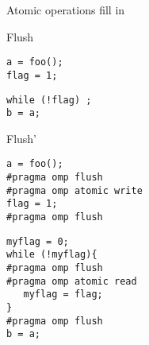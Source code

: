 
\begin{numberedframe}{Atomic operations}
fill in  
\end{numberedframe}

\begin{numberedframe}{Flush}
\begin{multicols}{2}
\begin{lstlisting}
a = foo();
flag = 1;
\end{lstlisting}
\columnbreak
\begin{lstlisting}
while (!flag) ;
b = a;
\end{lstlisting}
\end{multicols}
\end{numberedframe}

\begin{numberedframe}{Flush'}
\begin{multicols}{2}
\begin{lstlisting}
a = foo();
#pragma omp flush
#pragma omp atomic write
flag = 1;
#pragma omp flush
\end{lstlisting}
\columnbreak
\begin{lstlisting}
myflag = 0;
while (!myflag){
#pragma omp flush
#pragma omp atomic read
   myflag = flag;
}
#pragma omp flush
b = a;
\end{lstlisting}
\end{multicols}
\end{numberedframe}
